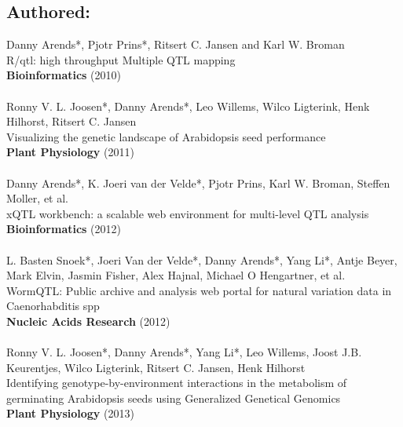 \documentclass[8pt, twoside]{book}
\newcommand{\authors}[1]{\small{#1}}
\newcommand{\bold}[1]{{\bfseries #1}}
\begin{document}
\subsection*{Authored:}
  \authors{Danny Arends*, Pjotr Prins*, Ritsert C. Jansen and Karl W. Broman}\\
  R/qtl: high throughput Multiple QTL mapping\\
  \bold{Bioinformatics} (2010)\\\\
  \authors{Ronny V. L. Joosen*, Danny Arends*, Leo Willems, Wilco Ligterink, Henk Hilhorst, Ritsert C. Jansen}\\
  Visualizing the genetic landscape of Arabidopsis seed performance\\
  \bold{Plant Physiology} (2011)\\\\
  \authors{Danny Arends*, K. Joeri van der Velde*, Pjotr Prins, Karl W. Broman, Steffen Moller, et al.}\\
  xQTL workbench: a scalable web environment for multi-level QTL analysis\\
  \bold{Bioinformatics} (2012)\\\\
  \authors{L. Basten Snoek*, Joeri Van der Velde*, Danny Arends*, Yang Li*, Antje Beyer, Mark Elvin, 
           Jasmin Fisher, Alex Hajnal, Michael O Hengartner, et al.}\\
  WormQTL: Public archive and analysis web portal for natural variation data in Caenorhabditis spp\\
  \bold{Nucleic Acids Research} (2012)\\\\
  \authors{Ronny V. L. Joosen*, Danny Arends*, Yang Li*, Leo Willems, Joost J.B. Keurentjes, Wilco Ligterink, 
           Ritsert C. Jansen, Henk Hilhorst}\\
  Identifying genotype-by-environment interactions in the metabolism of germinating Arabidopsis seeds 
  using Generalized Genetical Genomics\\
  \bold{Plant Physiology} (2013)
\end{document}
